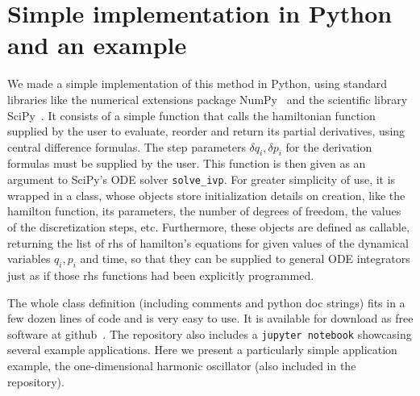 \documentclass{iopart}
\begin{document}
%
%
%
\section{Simple implementation in Python and an example}
We made a simple implementation of this method in Python, using standard
libraries like the numerical extensions package
NumPy~\cite{numpy:2011,numpy:2020} and the scientific library
SciPy~\cite{scipy}.  It consists of a simple function that calls the hamiltonian
function supplied by the user to evaluate, reorder and return its partial
derivatives, using central difference formulas. The step parameters $\delta q_i,
\delta p_i$ for the derivation formulas must be supplied by the user.  This
function is then given as an argument to SciPy's ODE solver \texttt{solve\_ivp}.
For greater simplicity of use, it is wrapped in a class, whose objects store
initialization details on creation, like the hamilton function, its parameters,
the number of degrees of freedom, the values of the discretization steps, etc.
Furthermore, these objects are defined as callable, returning the list of rhs of
hamilton's equations for given values of the dynamical variables $q_i, p_i$ and
time, so that they can be supplied to general ODE integrators just as if those
rhs functions had been explicitly programmed.

The whole class definition (including comments and python doc strings) fits in a
few dozen lines of code and is very easy to use. It is available for download as
free software at github~\cite{nevh:2020}.  The repository also includes a
\texttt{jupyter notebook} showcasing several example applications.  Here we
present a particularly simple application example, the one-dimensional harmonic
oscillator (also included in the repository).
\end{document}
